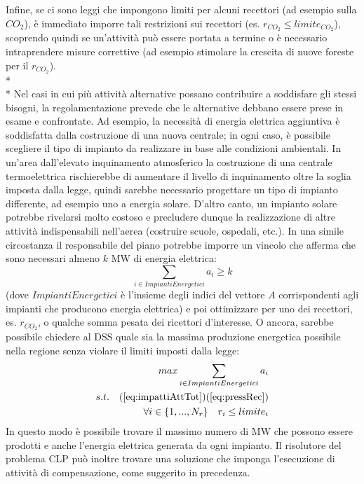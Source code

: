 \documentclass[12pt,a4paper,openright,twoside]{report}
\begin{document}
Infine, se ci sono leggi che impongono limiti per alcuni recettori (ad esempio sulla $CO_2$), è immediato imporre tali restrizioni sui recettori (es. $r_{CO_2} \leq limite_{CO_2}$), scoprendo quindi se un'attività può essere portata a termine o è necessario intraprendere misure correttive (ad esempio stimolare la crescita di nuove foreste per il $r_{CO_2}$).
\\* \\*
Nel casi in cui più attività alternative possano contribuire a soddisfare gli stessi bisogni, la regolamentazione prevede che le alternative debbano essere prese in esame e confrontate. Ad esempio, la necessità di energia elettrica aggiuntiva è soddisfatta dalla costruzione di una nuova centrale; in ogni caso, è possibile scegliere il tipo di impianto da realizzare in base alle condizioni ambientali. In un'area dall'elevato inquinamento atmosferico la costruzione di una centrale termoelettrica rischierebbe di aumentare il livello di inquinamento oltre la soglia imposta dalla legge, quindi sarebbe necessario progettare un tipo di impianto differente, ad esempio uno a energia solare. D'altro canto, un impianto solare potrebbe rivelarsi molto costoso e precludere dunque la realizzazione di altre attività indispensabili nell'aerea (costruire scuole, ospedali, etc.). In una simile circostanza il responsabile del piano potrebbe imporre un vincolo che afferma che sono necessari almeno $k$ MW di energia elettrica:
\begin{equation}
\label{eq:kEner}
	\sum_{i \in ImpiantiEnergetici} a_i \geq k
\end{equation}
(dove $ImpiantiEnergetici$ è l'insieme degli indici del vettore $A$ corrispondenti agli impianti che producono energia elettrica) e poi ottimizzare per uno dei recettori, es. $r_{CO_2}$, o qualche somma pesata dei ricettori d'interesse. O ancora, sarebbe possibile chiedere al DSS quale sia la massima produzione energetica possibile nella regione senza violare il limiti imposti dalla legge:  
\begin{equation}
\label{eq:maxOutLimLaw}
	\begin{aligned}
		max \sum_{{i \in ImpiantiEnergetici}}  a_i\\
		s.t. \quad (\ref{eq:impattiAttTot}) (\ref{eq:pressRec}) \\
		\forall i \in \{ 1,...,N_r \} \quad r_i \leq limite_i
	\end{aligned}
\end{equation}
In questo modo è possibile trovare il massimo numero di MW che possono essere prodotti e anche l'energia elettrica generata da ogni impianto. Il risolutore del problema CLP può inoltre trovare una soluzione che imponga l'esecuzione di attività di compensazione, come suggerito in precedenza.
\end{document}
